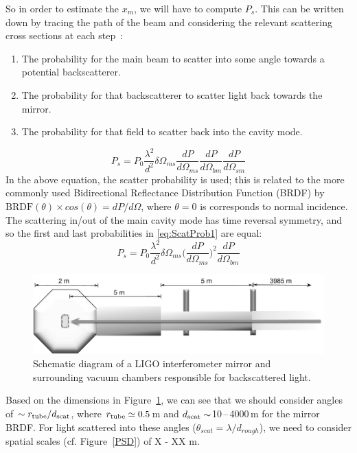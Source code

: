So in order to estimate the $x_m$, we will have to compute $P_s$.
This can be written down by tracing the path of the beam and considering
the relevant scattering cross sections at each step~\cite{Kip:Baffles1989}:
\begin{enumerate}
\item The probability for the main beam to scatter into some angle towards a potential backscatterer.
\item The probability for that backscatterer to scatter light back towards the mirror.
\item The probability for that field to scatter back into the cavity mode.
\end{enumerate}
\begin{equation}
P_s = P_0 \frac{\lambda^2}{d^2} \delta \Omega_{ms} \frac{dP}{d\Omega_{ms}} \frac{dP}{d\Omega_{bm}} \frac{dP}{d\Omega_{sm}}
\label{eq:ScatProb1}
\end{equation}
In the above equation, the scatter probability is used; this is related to the
more commonly used Bidirectional Reflectance Distribution Function (BRDF) by
$ \mathrm{BRDF}(\theta) \times cos(\theta) = dP/d\Omega$, where $\theta = 0$ is
corresponds to normal incidence.
The scattering in/out of the main cavity mode has time reversal symmetry,
and so the first and last probabilities in \eqref{eq:ScatProb1} are equal:
\begin{equation}
P_s = P_0 \frac{\lambda^2}{d^2} \delta \Omega_{ms}
\bigg(\frac{dP}{d\Omega_{ms}}\bigg)^2 \frac{dP}{d\Omega_{bm}}
\label{eq:ScatProb2}
\end{equation}

\begin{figure}[h]
  \centering
    \includegraphics[width=\columnwidth]{Figures/ETM_scatter-BW.pdf}
    \caption{Schematic diagram of a LIGO interferometer mirror and
    surrounding vacuum chambers responsible for backscattered light.}
    \label{fig:ETMscat}
\end{figure}

Based on the dimensions in Figure~\ref{fig:ETMscat}, we can see that
we should consider angles of $\sim r_{\rm tube}/d_{\rm scat}$, where
$r_{\rm tube} \simeq 0.5$\,m and $d_{\rm scat} \sim$10\,--\,4000\,m
for the mirror BRDF. For light scattered into these angles
($\theta_{scat} = \lambda / d_{rough}$), we need to consider spatial scales
(cf. Figure~\ref{PSD}) of X - XX m.

